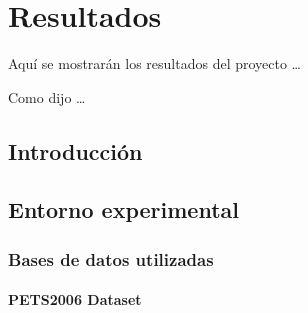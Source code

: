 
\chapter{Resultados}
\label{cha:resultados}

Aquí se mostrarán los resultados del proyecto \ldots

Como dijo \cite{lin2015microsoft} \ldots

\section{Introducción}
\label{sec:intro-resultados}

\section{Entorno experimental}
\label{sec:desarrollo-resultados}

\subsection{Bases de datos utilizadas}
\label{subsec:bases-datos}

\subsubsection{PETS2006 Dataset}

